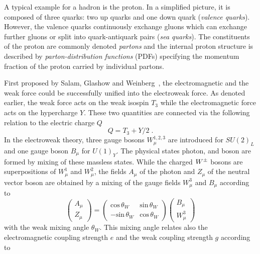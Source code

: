 \begin{description}
\begin{description}
A typical example for a hadron is the proton. In a simplified picture, it is composed of three quarks: two up quarks and one down quark (\textit{valence quarks}). However, the valence quarks continuously exchange gluons which can exchange further gluons or split into quark-antiquark pairs (\textit{sea quarks}). The constituents of the proton are commonly denoted \textit{partons} and the internal proton structure is described by \textit{parton-distribution functions} (PDFs) specifying the momentum fraction of the proton carried by individual partons.
 \end{description}
First proposed by Salam, Glashow and Weinberg~\cite{Glashow:1961tr, Weinberg:1967tq}, the electromagnetic and the weak force could be successfully unified into the electroweak force. As denoted earlier, the weak force acts on the weak isospin $T_{3}$ while the electromagnetic force acts on the hypercharge $Y$. These two quantities are connected via the following relation to the electric charge $Q$
\begin{equation*}
Q = T_{3} + Y/2 \; .
\end{equation*}
In the electroweak theory, three gauge bosons $W^{1,2,3}_{\mu}$ are introduced for $SU(2)_{L}$ and one gauge boson $B_{\mu}$ for $U(1)_{Y}$. The physical states photon, \Wpm and \Z boson are formed by mixing of these massless states. While the charged $W^{\pm}$ bosons are superpositions of $W^{1}_{\mu}$ and $W^{2}_{\mu}$, the fields $A_{\mu}$ of the photon and $Z_{\mu}$ of the neutral vector boson are obtained by a mixing of the gauge fields $W^{3}_{\mu}$ and $B_{\mu}$ according to
\begin{equation}
\left(
\begin{matrix}
A_{\mu} \\ Z_{\mu}
\end{matrix}
\right)
=
\left(
\begin{matrix}
\mathrm{cos} \, \theta_{W} & \mathrm{sin} \, \theta_{W} \\
-\mathrm{sin} \, \theta_{W} & \mathrm{cos} \, \theta_{W}
\end{matrix}
\right)
\left(
\begin{matrix}
 B_{\mu} \\ W^{3}_{\mu} 
\end{matrix}
\right)
\end{equation}
with the weak mixing angle $\theta_{W}$. This mixing angle relates also the electromagnetic coupling strength $e$ and the weak coupling strength $g$ according to
\begin{equation}

\end{equation}
\end{description}
